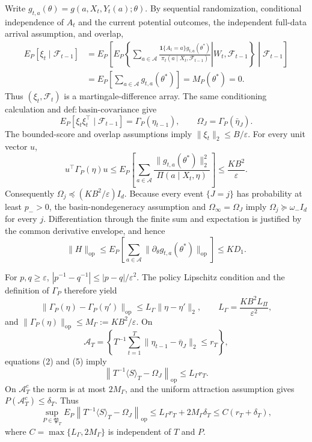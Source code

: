 Write \(g_{t,a}(\theta)=g(a,X_t,Y_t(a);\theta)\). By sequential randomization, conditional independence of \(A_t\) and the current potential outcomes, the independent full-data arrival assumption, and overlap,
\[
\begin{aligned}
 E_P[\xi_t\mid\mathcal F_{t-1}]
 &=E_P\!\left[E_P\!\left\{\left.\sum_{a\in\mathcal A}
 \frac{\mathbf1\{A_t=a\}g_{t,a}(\theta^*)}
 {\pi_t(a\mid X_t,\mathcal F_{t-1})}\right|W_t,\mathcal F_{t-1}\right\}\middle|\mathcal F_{t-1}\right]\\
 &=E_P\!\left[\sum_{a\in\mathcal A}g_{t,a}(\theta^*)\right]
 =M_P(\theta^*)=0.
\end{aligned}
\tag{1}
\]
Thus \((\xi_t,\mathcal F_t)\) is a martingale-difference array. The same conditioning calculation and \(\mathrm{def:basin\text{-}covariance}\) give
\[
 E_P[\xi_t\xi_t^\top\mid\mathcal F_{t-1}]=\Gamma_P(\eta_{t-1}),
 \qquad \Omega_J=\Gamma_P(\bar\eta_J).
\tag{2}
\]
The bounded-score and overlap assumptions imply \(\|\xi_t\|_2\le B/\varepsilon\). For every unit vector \(u\),
\[
 u^\top\Gamma_P(\eta)u
 \le E_P\!\left[\sum_{a\in\mathcal A}
 \frac{\|g_{t,a}(\theta^*)\|_2^2}{\Pi(a\mid X_t,\eta)}\right]
 \le\frac{KB^2}{\varepsilon}.
\tag{3}
\]
Consequently \(\Omega_j\preceq(KB^2/\varepsilon)I_d\). Because every event \(\{J=j\}\) has probability at least \(p_->0\), the basin-nondegeneracy assumption and \(\Omega_\infty=\Omega_J\) imply \(\Omega_j\succeq\omega_-I_d\) for every \(j\). Differentiation through the finite sum and expectation is justified by the common derivative envelope, and hence
\[
 \|H\|_{\mathrm{op}}
 \le E_P\!\left[\sum_{a\in\mathcal A}
 \|\partial_\theta g_{t,a}(\theta^*)\|_{\mathrm{op}}\right]
 \le KD_1.
\tag{4}
\]

For \(p,q\ge\varepsilon\), \(|p^{-1}-q^{-1}|\le|p-q|/\varepsilon^2\). The policy Lipschitz condition and the definition of \(\Gamma_P\) therefore yield
\[
 \|\Gamma_P(\eta)-\Gamma_P(\eta')\|_{\mathrm{op}}
 \le L_\Gamma\|\eta-\eta'\|_2,
 \qquad L_\Gamma=\frac{KB^2L_\Pi}{\varepsilon^2},
\tag{5}
\]
and \(\|\Gamma_P(\eta)\|_{\mathrm{op}}\le M_\Gamma:=KB^2/\varepsilon\). On
\[
 \mathcal A_T=\left\{T^{-1}\sum_{t=1}^T
 \|\eta_{t-1}-\bar\eta_J\|_2\le r_T\right\},
\]
equations (2) and (5) imply
\[
 \left\|T^{-1}\langle S\rangle_T-\Omega_J\right\|_{\mathrm{op}}
 \le L_\Gamma r_T.
\tag{6}
\]
On \(\mathcal A_T^c\) the norm is at most \(2M_\Gamma\), and the uniform attraction assumption gives \(P(\mathcal A_T^c)\le\delta_T\). Thus
\[
 \sup_{P\in\mathfrak P_T}E_P\left\|T^{-1}\langle S\rangle_T-\Omega_J\right\|_{\mathrm{op}}
 \le L_\Gamma r_T+2M_\Gamma\delta_T
 \le C(r_T+\delta_T),
\tag{7}
\]
where \(C=\max\{L_\Gamma,2M_\Gamma\}\) is independent of \(T\) and \(P\).

